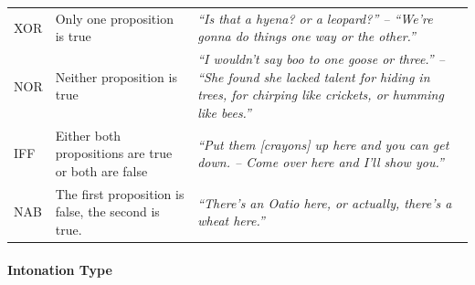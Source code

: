 \documentclass[oneside]{report}
\theoremstyle{definition}
\theoremstyle{definition}
\theoremstyle{definition}
\theoremstyle{remark}
\begin{document}
\begin{longtable}[]{@{}lll@{}}
\begin{minipage}[t]{0.11\columnwidth}
XOR\strut
\end{minipage} & \begin{minipage}[t]{0.27\columnwidth}\raggedright\strut
Only one proposition is true\strut
\end{minipage} & \begin{minipage}[t]{0.54\columnwidth}\raggedright\strut
\emph{``Is that a hyena? or a leopard?'' -- ``We're gonna do things one
way or the other.''}\strut
\end{minipage}\tabularnewline
\begin{minipage}[t]{0.11\columnwidth}\raggedright\strut
NOR\strut
\end{minipage} & \begin{minipage}[t]{0.27\columnwidth}\raggedright\strut
Neither proposition is true\strut
\end{minipage} & \begin{minipage}[t]{0.54\columnwidth}\raggedright\strut
\emph{``I wouldn't say boo to one goose or three.'' -- ``She found she
lacked talent for hiding in trees, for chirping like crickets, or
humming like bees.''}\strut
\end{minipage}\tabularnewline
\begin{minipage}[t]{0.11\columnwidth}\raggedright\strut
IFF\strut
\end{minipage} & \begin{minipage}[t]{0.27\columnwidth}\raggedright\strut
Either both propositions are true or both are false\strut
\end{minipage} & \begin{minipage}[t]{0.54\columnwidth}\raggedright\strut
\emph{``Put them {[}crayons{]} up here and you can get down. -- Come
over here and I'll show you.''}\strut
\end{minipage}\tabularnewline
\begin{minipage}[t]{0.11\columnwidth}\raggedright\strut
NAB\strut
\end{minipage} & \begin{minipage}[t]{0.27\columnwidth}\raggedright\strut
The first proposition is false, the second is true.\strut
\end{minipage} & \begin{minipage}[t]{0.54\columnwidth}\raggedright\strut
\emph{``There's an Oatio here, or actually, there's a wheat
here.''}\strut
\end{minipage}\tabularnewline
\bottomrule
\end{longtable}
\paragraph{Intonation Type}\label{intonation-type}
\end{document}
